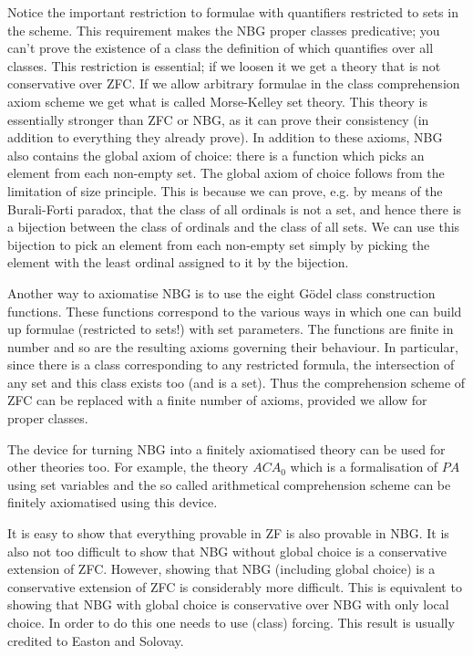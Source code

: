 \documentclass[12pt]{article}
\begin{document}
Notice the important restriction to formulae with quantifiers restricted to sets in the scheme. This requirement makes the NBG proper classes predicative; you can't prove the existence of a class the definition of which quantifies over all classes. This restriction is essential; if we loosen it we get a theory that is not conservative over ZFC. If we allow arbitrary formulae in the class comprehension axiom scheme we get what is called Morse-Kelley set theory. This theory is essentially stronger than ZFC or NBG, as it can prove their consistency (in addition to everything they already prove). In addition to these axioms, NBG also contains the global axiom of choice: there is a function which picks an element from each non-empty set. The global axiom of choice follows from the limitation of size principle. This is because we can prove, e.g. by means of the Burali-Forti paradox, that the class of all ordinals is not a set, and hence there is a bijection between the class of ordinals and the class of all sets. We can use this bijection to pick an element from each non-empty set simply by picking the element with the least ordinal assigned to it by the bijection.


Another way to axiomatise NBG is to use the eight G\"odel class construction functions. These functions correspond to the various ways in which one can build up formulae (restricted to sets!) with set parameters. The functions are finite in number and so are the resulting axioms governing their behaviour. In particular, since there is a class corresponding to any restricted formula, the intersection of any set and this class exists too (and is a set). Thus the comprehension scheme of ZFC can be replaced with a finite number of axioms, provided we allow for proper classes.

The device for turning NBG into a finitely axiomatised theory can be used for other theories too. For example, the theory $ACA_0$ which is a formalisation of $PA$ using set variables and the so called arithmetical comprehension scheme can be finitely axiomatised using this device.

It is easy to show that everything provable in ZF is also provable in NBG. It is also not too difficult to show that NBG without global choice is a conservative extension of ZFC. However, showing that NBG (including global choice) is a conservative extension of ZFC is considerably more difficult. This is equivalent to showing that NBG with global choice is conservative over NBG with only local choice. In order to do this one needs to use (class) forcing. This result is usually credited to Easton and Solovay.
\end{document}
